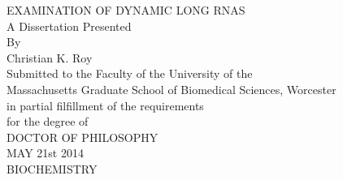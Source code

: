 \documentclass[12pt, letter, oneside]{Thesis} %
\begin{document}
\begin{titlepage}
\begin{center}
	\huge EXAMINATION OF DYNAMIC LONG RNAS\\[2cm] 
	{\large 
		A Dissertation Presented \\[1cm]
		By \\[1cm]
		Christian K. Roy \\[1cm]
		Submitted to the Faculty of the University of the \\
		Massachusetts Graduate School of Biomedical Sciences, Worcester\\
		in partial filfillment of the requirements\\
		for the degree of \\[2cm]
		DOCTOR OF PHILOSOPHY \\[1cm]
		MAY 21st 2014\\[1cm]
		BIOCHEMISTRY\\[1cm]
 	}
 \end{center}
 \end{titlepage}
\end{document}
